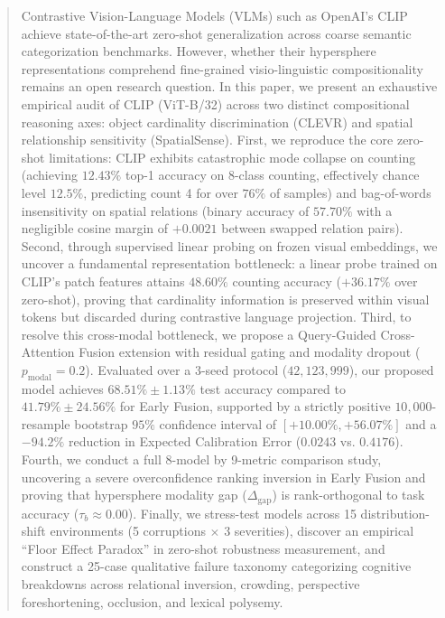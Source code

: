 \documentclass[conference]{IEEEtran}
\begin{document}
\begin{abstract}
Contrastive Vision-Language Models (VLMs) such as OpenAI's CLIP achieve state-of-the-art zero-shot generalization across coarse semantic categorization benchmarks. However, whether their hypersphere representations comprehend fine-grained visio-linguistic compositionality remains an open research question. In this paper, we present an exhaustive empirical audit of CLIP (ViT-B/32) across two distinct compositional reasoning axes: object cardinality discrimination (CLEVR) and spatial relationship sensitivity (SpatialSense). First, we reproduce the core zero-shot limitations: CLIP exhibits catastrophic mode collapse on counting (achieving $12.43\%$ top-1 accuracy on 8-class counting, effectively chance level $12.5\%$, predicting count 4 for over $76\%$ of samples) and bag-of-words insensitivity on spatial relations (binary accuracy of $57.70\%$ with a negligible cosine margin of $+0.0021$ between swapped relation pairs). Second, through supervised linear probing on frozen visual embeddings, we uncover a fundamental representation bottleneck: a linear probe trained on CLIP's patch features attains $48.60\%$ counting accuracy ($+36.17\%$ over zero-shot), proving that cardinality information is preserved within visual tokens but discarded during contrastive language projection. Third, to resolve this cross-modal bottleneck, we propose a Query-Guided Cross-Attention Fusion extension with residual gating and modality dropout ($p_{\text{modal}}=0.2$). Evaluated over a 3-seed protocol ($42, 123, 999$), our proposed model achieves $68.51\% \pm 1.13\%$ test accuracy compared to $41.79\% \pm 24.56\%$ for Early Fusion, supported by a strictly positive $10,000$-resample bootstrap $95\%$ confidence interval of $[+10.00\%, +56.07\%]$ and a $-94.2\%$ reduction in Expected Calibration Error ($0.0243$ vs. $0.4176$). Fourth, we conduct a full 8-model by 9-metric comparison study, uncovering a severe overconfidence ranking inversion in Early Fusion and proving that hypersphere modality gap ($\Delta_{\text{gap}}$) is rank-orthogonal to task accuracy ($\tau_b \approx 0.00$). Finally, we stress-test models across 15 distribution-shift environments (5 corruptions $\times$ 3 severities), discover an empirical ``Floor Effect Paradox'' in zero-shot robustness measurement, and construct a 25-case qualitative failure taxonomy categorizing cognitive breakdowns across relational inversion, crowding, perspective foreshortening, occlusion, and lexical polysemy.
\end{abstract}
\end{document}
